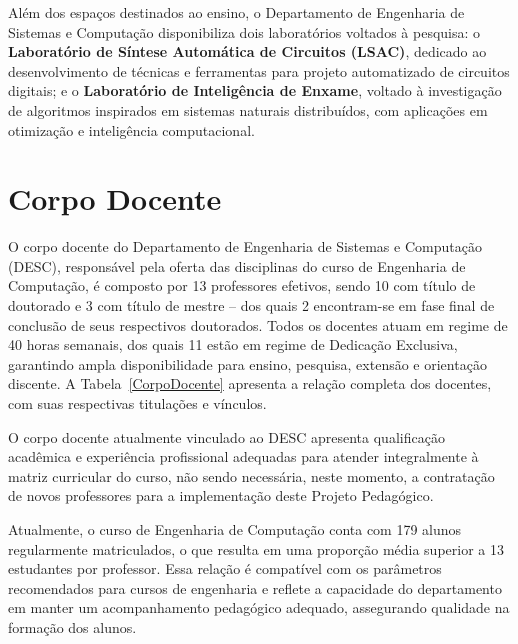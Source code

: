 Além dos espaços destinados ao ensino, o Departamento de Engenharia de Sistemas e Computação disponibiliza dois laboratórios voltados à pesquisa: o \textbf{Laboratório de Síntese Automática de Circuitos (LSAC)}, dedicado ao desenvolvimento de técnicas e ferramentas para projeto automatizado de circuitos digitais; e o \textbf{Laboratório de Inteligência de Enxame}, voltado à investigação de algoritmos inspirados em sistemas naturais distribuídos, com aplicações em otimização e inteligência computacional.
\section{Corpo Docente}

O corpo docente do Departamento de Engenharia de Sistemas e Computação (DESC), responsável pela oferta das disciplinas do curso de Engenharia de Computação, é composto por 13 professores efetivos, sendo 10 com título de doutorado e 3 com título de mestre – dos quais 2 encontram-se em fase final de conclusão de seus respectivos doutorados. Todos os docentes atuam em regime de 40 horas semanais, dos quais 11 estão em regime de Dedicação Exclusiva, garantindo ampla disponibilidade para ensino, pesquisa, extensão e orientação discente. A Tabela~\ref{CorpoDocente} apresenta a relação completa dos docentes, com suas respectivas titulações e vínculos.

O corpo docente atualmente vinculado ao DESC apresenta qualificação acadêmica e experiência profissional adequadas para atender integralmente à matriz curricular do curso, não sendo necessária, neste momento, a contratação de novos professores para a implementação deste Projeto Pedagógico.

Atualmente, o curso de Engenharia de Computação conta com 179 alunos regularmente matriculados, o que resulta em uma proporção média superior a 13 estudantes por professor. Essa relação é compatível com os parâmetros recomendados para cursos de engenharia e reflete a capacidade do departamento em manter um acompanhamento pedagógico adequado, assegurando qualidade na formação dos alunos.

